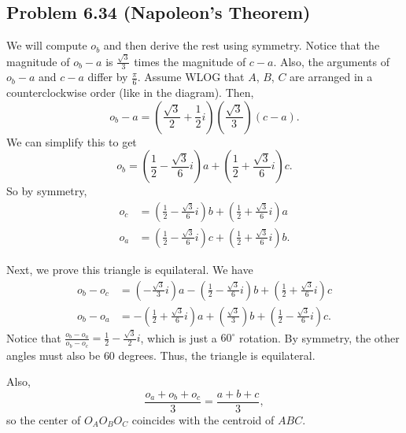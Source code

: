 \documentclass{scrartcl}
\begin{document}
\subsection*{Problem 6.34 (Napoleon's Theorem)}

We will compute $o_b$ and then derive the rest using symmetry.
Notice that the magnitude of $o_b - a$ is $\frac{\sqrt{3}}{3}$ times the magnitude of $c - a$. Also, the arguments of $o_b - a$ and $c - a$ differ by $\frac{\pi}{6}$.
Assume WLOG that $A$, $B$, $C$ are arranged in a counterclockwise order (like in the diagram).
Then,
\[
    o_b - a = \left( \frac{\sqrt{3}}{2} + \frac{1}{2}i \right)\left( \frac{\sqrt{3}}{3} \right)(c - a).
\]
We can simplify this to get
\[
    o_b = \left( \frac{1}{2} - \frac{\sqrt{3}}{6}i \right)a + \left( \frac{1}{2} + \frac{\sqrt{3}}{6}i \right)c. 
\]
So by symmetry,
\begin{align*}
    o_c &= \left( \frac{1}{2} - \frac{\sqrt{3}}{6}i \right)b + \left( \frac{1}{2} + \frac{\sqrt{3}}{6}i \right)a \\
    o_a &= \left( \frac{1}{2} - \frac{\sqrt{3}}{6}i \right)c + \left( \frac{1}{2} + \frac{\sqrt{3}}{6}i \right)b.
\end{align*}

Next, we prove this triangle is equilateral. We have
\begin{align*}
    o_b - o_c &= \left( -\frac{\sqrt{3}}{3}i \right)a - \left( \frac{1}{2} - \frac{\sqrt{3}}{6}i \right)b + \left( \frac{1}{2} + \frac{\sqrt{3}}{6}i \right)c \\
    o_b - o_a &= -\left( \frac{1}{2} + \frac{\sqrt{3}}{6}i \right)a + \left( \frac{\sqrt{3}}{3} \right)b + \left( \frac12 - \frac{\sqrt{3}}{6}i \right)c.
\end{align*}
Notice that $\frac{o_b - o_a}{o_b - o_c} = \frac{1}{2} - \frac{\sqrt{3}}{2}i$, which is just a $60^\circ$ rotation. By symmetry, the other angles must also be $60$ degrees. Thus, the triangle is equilateral.

Also,
\[
    \frac{o_a + o_b + o_c}{3} = \frac{a + b + c}{3},
\]
so the center of $O_AO_BO_C$ coincides with the centroid of $ABC$.
\end{document}
